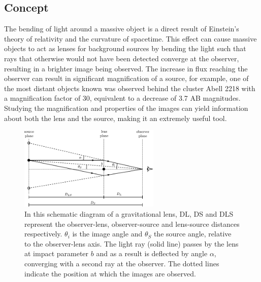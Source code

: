 	\subsection{Concept} %
	\label{sub:concept}
		The bending of light around a massive object is a direct result of Einstein's theory of relativity and the curvature of spacetime. This effect can cause massive objects to act as lenses for background sources by bending the light such that rays that otherwise would not have been detected converge at the observer, resulting in a brighter image being observed. The increase in flux reaching the observer can result in significant magnification of a source, for example, one of the most distant objects known was observed behind the cluster Abell 2218 with a magnification factor of 30, equivalent to a decrease of 3.7 AB magnitudes\cite{Distant_object_Abell2218}. Studying the magnification and properties of the images can yield information about both the lens and the source, making it an extremely useful tool\cite{Hartle}.
		\begin{figure}[!htbp]
			\centering
				\includegraphics[width=0.6\textwidth]{../Images/Lensing_light_bending.pdf}
			\caption[Diagram of a gravitational lens]{In this schematic diagram of a gravitational lens, DL, DS and DLS represent the observer-lens, observer-source and lens-source distances respectively. $\theta_i$ is the image angle and $\theta_S$ the source angle, relative to the observer-lens axis. The light ray (solid line) passes by the lens at impact parameter $b$ and as a result is deflected by angle $\alpha$, converging with a second ray at the observer. The dotted lines indicate the position at which the images are observed\cite{Lensing_light_bending_diagram}.\label{fig:Lensing_light_bending}}
		\end{figure}


